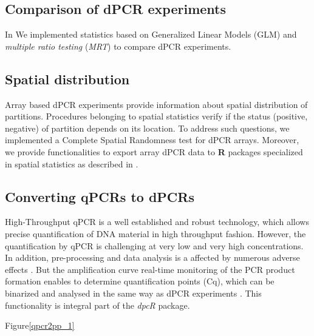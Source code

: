 \documentclass[a4,center,fleqn]{NAR}
\begin{document}
\subsection{Comparison of dPCR experiments}

In \cite{Burdukiewicz_tba} We implemented statistics based on Generalized 
Linear 
Models (GLM) and \textit{multiple ratio testing} (\textit{MRT}) to compare dPCR 
experiments. 

\subsection{Spatial distribution}

Array based dPCR experiments provide information about spatial distribution of 
partitions. Procedures belonging to spatial statistics verify if the status 
(positive, negative) of partition depends on its location. To address such 
questions, we implemented a Complete Spatial Randomness test for dPCR arrays. 
Moreover, we provide functionalities to export array dPCR data to \textbf{R} 
packages specialized in spatial statistics as described in 
\cite{Baddeley_2015}.

\subsection{Converting qPCRs to dPCRs}

High-Throughput qPCR is a well established and robust technology, which allows 
precise quantification of DNA material in high throughput fashion. However, the 
quantification by qPCR is challenging at very low and very high concentrations. 
In addition, pre-processing and data analysis is a affected by numerous adverse 
effects \cite{ruijter_2013, pabinger_survey_2014, spiess_impact_2015}. But the 
amplification curve real-time monitoring of the PCR product formation enables 
to 
determine quantification points (Cq), which can be binarized and analysed in 
the 
same way as dPCR experiments \cite{mojtahedi_2014}. This functionality is 
integral part of the \textit{dpcR} package.

Figure\ref{qpcr2pp_1}
\end{document}
